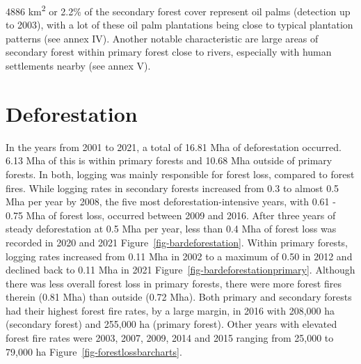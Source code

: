 \documentclass[
  letterpaper,
  DIV=11,
  numbers=noendperiod]{scrreprt}
\begin{document}
4886 km\textsuperscript{2} or 2.2\% of the secondary forest cover
represent oil palms (detection up to 2003), with a lot of these oil palm
plantations being close to typical plantation patterns (see annex IV).
Another notable characteristic are large areas of secondary forest
within primary forest close to rivers, especially with human settlements
nearby (see annex V).

\hypertarget{deforestation-1}{%
\section{Deforestation}\label{deforestation-1}}

In the years from 2001 to 2021, a total of 16.81 Mha of deforestation
occurred. 6.13 Mha of this is within primary forests and 10.68 Mha
outside of primary forests. In both, logging was mainly responsible for
forest loss, compared to forest fires. While logging rates in secondary
forests increased from 0.3 to almost 0.5 Mha per year by 2008, the five
most deforestation-intensive years, with 0.61 - 0.75 Mha of forest loss,
occurred between 2009 and 2016. After three years of steady
deforestation at 0.5 Mha per year, less than 0.4 Mha of forest loss was
recorded in 2020 and 2021 Figure~\ref{fig-bardeforestation}. Within
primary forests, logging rates increased from 0.11 Mha in 2002 to a
maximum of 0.50 in 2012 and declined back to 0.11 Mha in 2021
Figure~\ref{fig-bardeforestationprimary}. Although there was less
overall forest loss in primary forests, there were more forest fires
therein (0.81 Mha) than outside (0.72 Mha). Both primary and secondary
forests had their highest forest fire rates, by a large margin, in 2016
with 208,000 ha (secondary forest) and 255,000 ha (primary forest).
Other years with elevated forest fire rates were 2003, 2007, 2009, 2014
and 2015 ranging from 25,000 to 79,000 ha
Figure~\ref{fig-forestlossbarcharts}.
\end{document}
